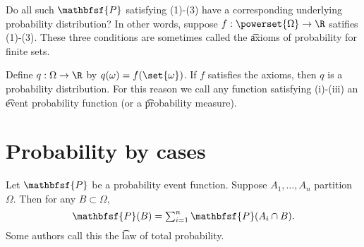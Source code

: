 Do all such $\mathbfsf{P} $ satisfying (1)-(3) have a corresponding underlying probability distribution?
In other words, suppose $f: \powerset{\Omega } \to \R $ satifies (1)-(3).
These three conditions are sometimes called the \t{axioms of probability for finite sets}.

Define $q: \Omega  \to \R $ by $q(\omega ) = f(\set{\omega })$.
If $f$ satisfies the axioms, then $q$ is a probability distribution.
For this reason we call any function satisfying (i)-(iii) an \t{event probability function} (or a \t{probability measure}).

\section*{Probability by cases}

Let $\mathbfsf{P} $ be a probability event function.
Suppose $A_1, \dots , A_n$ partition $\Omega $.
Then for any $B \subset \Omega $,
  \[
\textstyle
\mathbfsf{P} (B) = \sum_{i = 1}^{n} \mathbfsf{P} (A_i \cap B).
  \]
Some authors call this the \t{law of total probability}.
